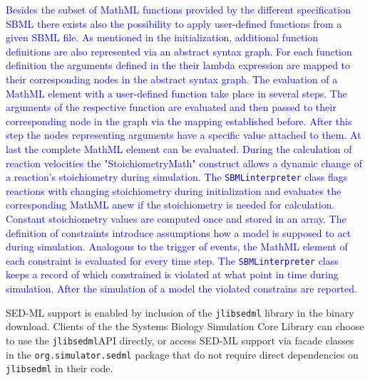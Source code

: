 \documentclass[10pt]{bmc_article}
\newenvironment{bmcformat}{\fussy\setboolean{publ}{true}}{\fussy}
\newcommand{\COR}[1]{\textcolor{blue}{#1}}
\newcommand{\SBMLinterpreter}{\texttt{SBML\-interpreter}\xspace}
\newcommand{\jlibsedml}{\texttt{jlibsedml}\xspace}
\begin{document}
\begin{bmcformat}
%
%
\COR{Besides the subset of MathML functions provided by the different specification \acs{SBML} there exists also the possibility to apply user-defined functions from a given \acs{SBML} file. As mentioned in the initialization, additional function definitions are also represented via an abstract syntax graph. For each function definition the arguments defined in the their lambda expression are mapped to their corresponding nodes in the abstract syntax graph. The evaluation of a MathML element with a user-defined function take place in several steps. The arguments of the respective function are evaluated and then passed to their corresponding node in the graph via the mapping established before. After this step the nodes representing arguments have a specific value attached to them. At last the complete MathML element can be evaluated.}
\COR{During the calculation of reaction velocities the "StoichiometryMath" construct allows a dynamic change of a reaction's stoichiometry during simulation. The \SBMLinterpreter class flags reactions with changing stoichiometry during initialization and evaluates the corresponding MathML anew if the stoichiometry is needed for calculation. Constant stoichiometry values are computed once and stored in an array.}
\COR{The definition of constraints introduce assumptions how a model is supposed to act during simulation. Analogous to the trigger of events, the MathML element of each constraint is evaluated for every time step. The \SBMLinterpreter class keeps a record of which constrained is violated at what point in time during simulation. After the simulation of a model the violated constrains are reported.}

\acs{SED-ML} support is enabled by inclusion of the \jlibsedml library \COR{\cite{jlibsedml2013}} in the binary download.
Clients of the the Systems Biology Simulation Core Library can choose to use the \jlibsedml \acs{API} directly, or access \acs{SED-ML} support via  facade classes in the \texttt{org.simulator.sedml} package that do not require direct dependencies on \jlibsedml in their code.



\end{bmcformat}
\end{document}
